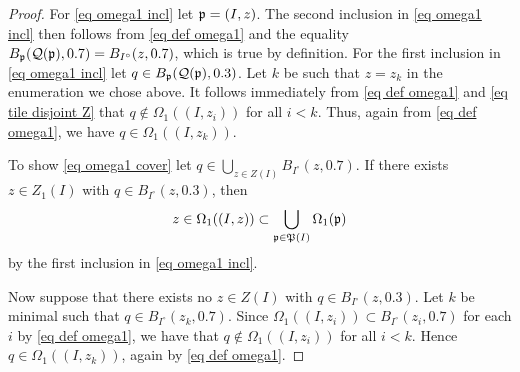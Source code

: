 \begin{proof}
    For \eqref{eq omega1 incl} let $\mathfrak p = (I, z)$.
    The second inclusion in \eqref{eq omega1 incl} then follows from \eqref{eq def omega1} and the equality $B_{\mathfrak p}(\mathcal{Q}(\mathfrak p), 0.7) = B_{I^\circ}(z, 0.7)$, which is true by definition.
    For the first inclusion in \eqref{eq omega1 incl} let $q \in B_{\mathfrak p}(\mathcal{Q}(\mathfrak p),0.3)$. Let $k$ be such that $z = z_k$ in the enumeration we chose above. It follows immediately from \eqref{eq def omega1} and \eqref{eq tile disjoint Z} that
    $q \notin \Omega_1((I, z_i))$ for all $i < k$. Thus, again from \eqref{eq def omega1}, we have
    $q \in \Omega_1((I,z_k))$.

    To show \eqref{eq omega1 cover} let $q \in \bigcup_{z \in Z(I)} B_{I^\circ}(z,0.7)$.
    If there exists $z \in Z_1(I)$ with $q \in B_{I^\circ}(z,0.3)$, then
    $$
        z \in \Omega_1((I, z)) \subset \bigcup_{\mathfrak p \in \mathfrak P(I)} \Omega_1(\mathfrak p)
    $$
    by the first inclusion in \eqref{eq omega1 incl}.

    Now suppose that there exists no $z \in Z(I)$ with $q \in B_{I^\circ}(z, 0.3)$. Let $k$ be minimal such that $q \in B_{I^\circ}(z_k, 0.7)$. Since $\Omega_1((I, z_i)) \subset B_{I^\circ}(z_i, 0.7)$ for each $i$ by \eqref{eq def omega1}, we have that $q \notin \Omega_1((I, z_i))$ for all $i < k$. Hence $q \in \Omega_1((I, z_k))$, again by \eqref{eq def omega1}.
\end{proof}

